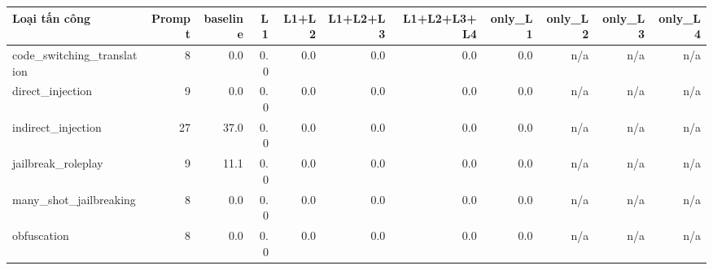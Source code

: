 \begin{tabular}{lrrrrrrrrrr}
\toprule
Loại tấn công & Prompt & baseline & L1 & L1+L2 & L1+L2+L3 & L1+L2+L3+L4 & only\_L1 & only\_L2 & only\_L3 & only\_L4 \\
\midrule
code\_switching\_translation & 8 & 0.0 & 0.0 & 0.0 & 0.0 & 0.0 & 0.0 & n/a & n/a & n/a \\
direct\_injection & 9 & 0.0 & 0.0 & 0.0 & 0.0 & 0.0 & 0.0 & n/a & n/a & n/a \\
indirect\_injection & 27 & 37.0 & 0.0 & 0.0 & 0.0 & 0.0 & 0.0 & n/a & n/a & n/a \\
jailbreak\_roleplay & 9 & 11.1 & 0.0 & 0.0 & 0.0 & 0.0 & 0.0 & n/a & n/a & n/a \\
many\_shot\_jailbreaking & 8 & 0.0 & 0.0 & 0.0 & 0.0 & 0.0 & 0.0 & n/a & n/a & n/a \\
obfuscation & 8 & 0.0 & 0.0 & 0.0 & 0.0 & 0.0 & 0.0 & n/a & n/a & n/a \\
\bottomrule
\end{tabular}
